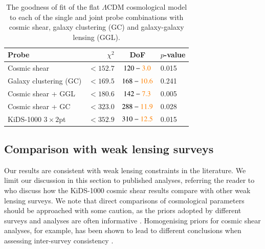 \begin{table}
	\begin{center}
		\caption{The goodness of fit of the flat $\Lambda$CDM cosmological model to each of the single and joint probe combinations with cosmic shear, galaxy clustering (GC) and galaxy-galaxy lensing (GGL).}
		\label{tab:goodness-of-fit}
\begin{tabular}{lrcl}
    \toprule
    Probe             & $\chi^2$       & DoF       & $p$-value   \\
    \midrule
	Cosmic shear     & $< 152.7$ & $120-\textcolor{orange}{3.0}$ & 0.015 \\
	Galaxy clustering (GC) & $< 169.5$ & $168-\textcolor{orange}{10.6}$ & 0.241 \\
	Cosmic shear + GGL & $< 180.6$ & $142-\textcolor{orange}{7.3}$ & 0.005 \\
	Cosmic shear + GC & $< 323.0$ & $288-\textcolor{orange}{11.9}$ & 0.028 \\
	KiDS-1000 $3\times2$pt & $< 352.9$ & $310-\textcolor{orange}{12.5}$ & 0.015 \\

    \bottomrule
\end{tabular}
	\end{center}
\end{table}

\subsection{Comparison with weak lensing surveys}
\label{sec:WL_comp}
Our results are consistent with weak lensing constraints in the literature.   We limit our discussion in this section to published \tttp analyses, referring the reader to \citet{asgari/etal:inprep} who discuss how the KiDS-1000 cosmic shear results compare with other weak lensing surveys.   We note that direct comparisons of cosmological parameters should be approached with some caution, as the priors adopted by different surveys and analyses are often informative \citep[see section 6.1 in][]{joachimi/etal:inprep}.   Homogenising priors for cosmic shear analyses, for example, has been shown to lead to different conclusions when assessing inter-survey consistency \citep{chang/etal:2019, joudaki/etal:2020, asgari/etal:2020_KD}.   

